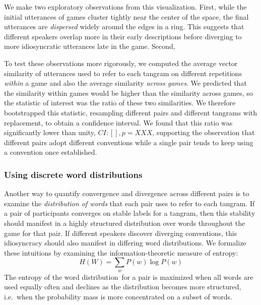 \documentclass[alpha-refs]{wiley-article}
\begin{document}
We make two exploratory observations from this visualization.
First, while the initial utterances of games cluster tightly near the center of the space, the final utterances are \emph{dispersed} widely around the edges in a ring. 
This suggests that different speakers overlap more in their early descriptions before diverging to more idiosyncratic utterances late in the game.
Second, 

To test these observations more rigorously, we computed the average vector similarity of utterances used to refer to each tangram on different repetitions \emph{within} a game and also the average similarity \emph{across games}. 
We predicted that the similarity within games would be higher than the similarity across games, so the statistic of interest was the ratio of these two similarities.
We therefore bootstrapped this statistic, resampling different pairs and different tangrams with replacement, to obtain a confidence interval. 
We found that this ratio was significantly lower than unity, $CI: [], p = XXX$, supporting the observation that different pairs adopt different conventions while a single pair tends to keep using a convention once established.


\subsubsection{Using discrete word distributions}
Another way to quantify convergence and divergence across different pairs is to examine the \emph{distribution of words} that each pair uses to refer to each tangram.
If a pair of participants converges on stable labels for a tangram, then this stability should manifest in a highly structured distribution over words throughout the game for that pair.
If different speakers discover diverging conventions, this idiosyncracy should also manifest in differing word distributions.
We formalize these intuitions by examining the information-theoretic measure of entropy: $$H(W) = \sum_w P(w) \log P(w)$$
The entropy of the word distribution for a pair is maximized when all words are used equally often and declines as the distribution becomes more structured, i.e.~when the probability mass is more concentrated on a subset of words.
\end{document}
